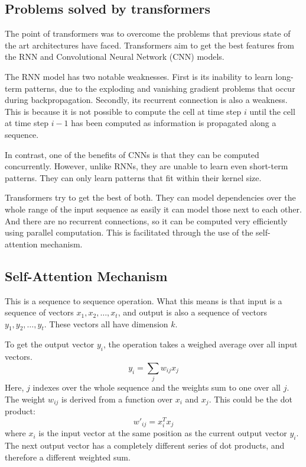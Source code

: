\subsection{Problems solved by transformers}
The point of transformers was to overcome the problems that previous state of the art architectures have faced. Transformers aim to get the best features from the RNN and Convolutional Neural Network (CNN) models.

The RNN model has two notable weaknesses. First is its inability to learn long-term patterns, due to the exploding and vanishing gradient problems that occur during backpropagation.
Secondly, its recurrent connection is also a weakness. This is because it is not possible to compute the cell at time step $i$ until the cell at time step $i-1$ has been computed as information is propagated along a sequence.

In contrast, one of the benefits of CNNs is that they can be computed concurrently. However, unlike RNNs, they are unable to learn even short-term patterns. They can only learn patterns that fit within their kernel size.

Transformers try to get the best of both.
They can model dependencies over the whole range of the input sequence as easily it can model those next to each other. And there are no recurrent connections, so it can be computed very efficiently using parallel computation. This is facilitated through the use of the self-attention mechanism.\cite{TransformersScratchPeterbloem}


\subsection{Self-Attention Mechanism}
This is a sequence to sequence operation. What this means is that input is a sequence of vectors $x_{1},x_{2},\ldots, x_{t}$, and output is also a sequence of vectors $y_{1},y_{2},\ldots, y_{t}$.
These vectors all have dimension $k$.

To get the output vector $y_{i}$, the operation takes a weighed average over all input vectors.
$$
y_{i}=\sum_{j}w_{ij}x_{j}
$$
Here, $j$ indexes over the whole sequence and the weights sum to one over all $j$.
The weight $w_{ij}$ is derived from a function over $x_{i}$ and $x_{j}$.
This could be the dot product:
$$
w'_{ij}=x_{i}^Tx_{j}
$$
where $x_{i}$ is the input vector at the same position as the current output vector $y_{i}$.
The next output vector has a completely different series of dot products, and therefore a different weighted sum.

